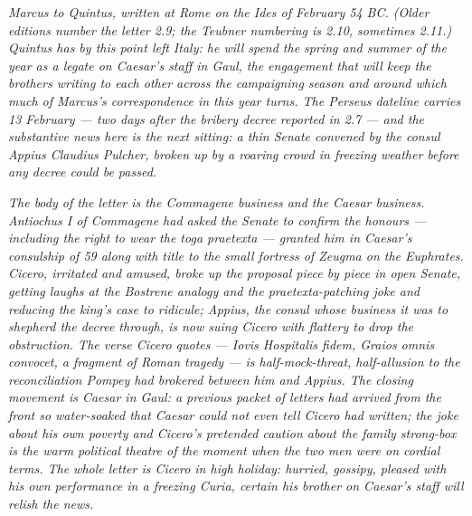 
\textit{Marcus to Quintus, written at Rome on the Ides of February
54 BC. (Older editions number the letter 2.9; the Teubner
numbering is 2.10, sometimes 2.11.) Quintus has by this point left
Italy: he will spend the spring and summer of the year as a
legate on Caesar's staff in Gaul, the engagement that will keep
the brothers writing to each other across the campaigning season
and around which much of Marcus's correspondence in this year
turns. The Perseus dateline carries 13 February --- two days
after the bribery decree reported in 2.7 --- and the substantive
news here is the next sitting: a thin Senate convened by the
consul Appius Claudius Pulcher, broken up by a roaring crowd in
freezing weather before any decree could be passed.}

\textit{The body of the letter is the Commagene business and the
Caesar business. Antiochus I of Commagene had asked the Senate
to confirm the honours --- including the right to wear the
\textit{toga praetexta} --- granted him in Caesar's consulship of
59 along with title to the small fortress of Zeugma on the
Euphrates. Cicero, irritated and amused, broke up the proposal
piece by piece in open Senate, getting laughs at the Bostrene
analogy and the praetexta-patching joke and reducing the king's
case to ridicule; Appius, the consul whose business it was to
shepherd the decree through, is now suing Cicero with flattery
to drop the obstruction. The verse Cicero quotes ---
\textit{Iovis Hospitalis fidem, Graios omnis convocet}, a
fragment of Roman tragedy --- is half-mock-threat, half-allusion
to the reconciliation Pompey had brokered between him and
Appius. The closing movement is Caesar in Gaul: a previous packet
of letters had arrived from the front so water-soaked that
Caesar could not even tell Cicero had written; the joke about
his own poverty and Cicero's pretended caution about the family
strong-box is the warm political theatre of the moment when the
two men were on cordial terms. The whole letter is Cicero in
high holiday: hurried, gossipy, pleased with his own performance
in a freezing Curia, certain his brother on Caesar's staff will
relish the news.}
